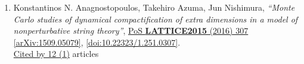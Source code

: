 \documentclass[a4paper,10pt]{article}
\begin{document}
\begin{enumerate}
\begin{enumerate}
\end{enumerate}
\item Konstantinos N. Anagnostopoulos, Takehiro Azuma, Jun Nishimura, {\it ``Monte Carlo studies of dynamical compactification of extra dimensions in a model of nonperturbative string theory''}, \href{https://www.doi.org/10.22323/1.251.0307}{PoS {\bf LATTICE2015} (2016) 307} \href{https://arxiv.org/abs/1509.05079}{[arXiv:1509.05079]}, \href{https://www.doi.org/10.22323/1.251.0307}{[doi:10.22323/1.251.0307]}.
\\\href{https://inspirehep.net/literature/?q=refersto%3Arecid%3A1393762}{Cited by 12 (1)} articles


\end{enumerate}
\end{document}
